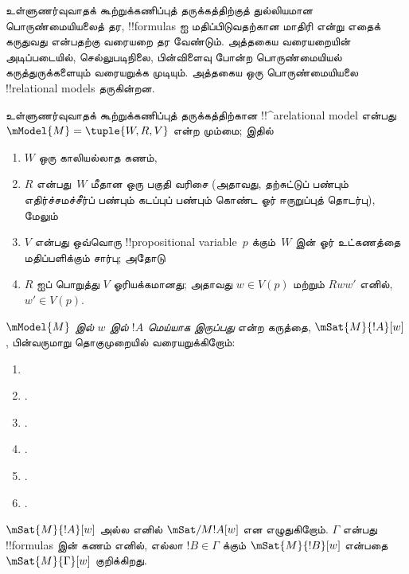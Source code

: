 \documentclass[../../../include/open-logic-section]{subfiles}
\begin{document}


உள்ளுணர்வுவாதக் கூற்றுக்கணிப்புத் தருக்கத்திற்குத் துல்லியமான
பொருண்மையியலைத் தர, !!{formula}s ஐ மதிப்பிடுவதற்கான மாதிரி என்று எதைக்
கருதுவது என்பதற்கு வரையறை தர வேண்டும். அத்தகைய வரையறையின் அடிப்படையில்,
செல்லுபடிநிலை, பின்விளைவு போன்ற பொருண்மையியல் கருத்துருக்களையும் வரையறுக்க
முடியும். அத்தகைய ஒரு பொருண்மையியலை !!{relational model}s தருகின்றன.

\begin{defn}
  உள்ளுணர்வுவாதக் கூற்றுக்கணிப்புத் தருக்கத்திற்கான
  !!^a{relational model} என்பது $\mModel{M} = \tuple{W, R, V}$ என்ற
  மும்மை; இதில்
  \begin{enumerate}
  \item $W$ ஒரு காலியல்லாத கணம்,
  \item $R$ என்பது~$W$ மீதான ஒரு பகுதி வரிசை (அதாவது, தற்சுட்டுப் பண்பும்
    எதிர்ச்சமச்சீர்ப் பண்பும் கடப்புப் பண்பும் கொண்ட ஓர் ஈருறுப்புத் தொடர்பு),
    மேலும்
  \item $V$ என்பது ஒவ்வொரு !!{propositional variable}~$p$ க்கும்~$W$ இன்
    ஓர் உட்கணத்தை மதிப்பளிக்கும் சார்பு; அதோடு
  \item $R$ ஐப் பொறுத்து $V$ ஓரியக்கமானது; அதாவது $w \in V(p)$ மற்றும்
    $Rww'$ எனில், $w' \in V(p)$.
  \end{enumerate}
\end{defn}

\begin{defn}
  \emph{$\mModel{M}$ இல் $w$ இல் $!A$ மெய்யாக இருப்பது} என்ற கருத்தை,
  $\mSat{M}{!A}[w]$, பின்வருமாறு தொகுமுறையில் வரையறுக்கிறோம்:
  \begin{enumerate}
  \item {}
  \item {}.
  \item {}.
  \item {}.
  \item {}.
  \item {}.
  \end{enumerate}
  $\mSat{M}{!A}[w]$ அல்ல எனில் $\mSat/{M}{!A}[w]$ என எழுதுகிறோம். $\Gamma$
  என்பது !!{formula}s இன் கணம் எனில், எல்லா $!B \in \Gamma$ க்கும்
  $\mSat{M}{!B}[w]$ என்பதை $\mSat{M}{\Gamma}[w]$ குறிக்கிறது.
\end{defn}
\end{document}
